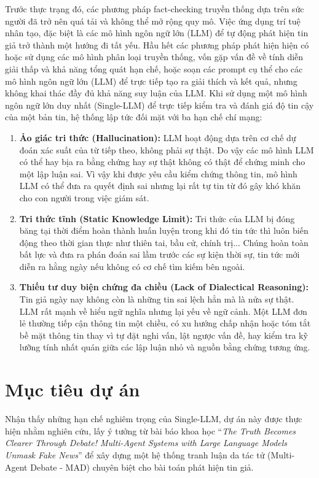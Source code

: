 \documentclass[12pt,a4paper]{report}
\begin{document}
Trước thực trạng đó, các phương pháp fact-checking truyền thống dựa trên sức người đã trở nên quá tải và không thể mở rộng quy mô. Việc ứng dụng trí tuệ nhân tạo, đặc biệt là các mô hình ngôn ngữ lớn (LLM) để tự động phát hiện tin giả trở thành một hướng đi tất yếu. Hầu hết các phương pháp phát hiện hiện có hoặc sử dụng các mô hình phân loại truyền thống, vốn gặp vấn đề về tính diễn giải thấp và khả năng tổng quát hạn chế, hoặc soạn các prompt cụ thể cho các mô hình ngôn ngữ lớn (LLM) để trực tiếp tạo ra giải thích và kết quả, nhưng không khai thác đầy đủ khả năng suy luận của LLM. Khi sử dụng một mô hình ngôn ngữ lớn duy nhất (Single-LLM) để trực tiếp kiểm tra và đánh giá độ tin cậy của một bản tin, hệ thống lập tức đối mặt với ba hạn chế chí mạng:
\begin{enumerate}
    \item \textbf{Ảo giác tri thức (Hallucination):} LLM hoạt động dựa trên cơ chế dự đoán xác suất của từ tiếp theo, không phải sự thật. Do vậy các mô hình LLM có thể hay bịa ra bằng chứng hay sự thật không có thật để chứng minh cho một lập luận sai. Vì vậy khi được yêu cầu kiểm chứng thông tin, mô hình LLM có thể đưa ra quyết định sai nhưng lại rất tự tin từ đó gây khó khăn cho con người trong việc giám sát.
    \item \textbf{Tri thức tĩnh (Static Knowledge Limit):} Tri thức của LLM bị đóng băng tại thời điểm hoàn thành huấn luyện trong khi đó tin tức thì luôn biến động theo thời gian thực như thiên tai, bầu cử, chính trị... Chúng hoàn toàn bất lực và đưa ra phán đoán sai lầm trước các sự kiện thời sự, tin tức mới diễn ra hằng ngày nếu không có cơ chế tìm kiếm bên ngoài.
    \item \textbf{Thiếu tư duy biện chứng đa chiều (Lack of Dialectical Reasoning):} Tin giả ngày nay không còn là những tin sai lệch hẳn mà là nửa sự thật. LLM rất mạnh về hiểu ngữ nghĩa nhưng lại yếu về ngữ cảnh. Một LLM đơn lẻ thường tiếp cận thông tin một chiều, có xu hướng chấp nhận hoặc tóm tắt bề mặt thông tin thay vì tự đặt nghi vấn, lật ngược vấn đề, hay kiểm tra kỹ lưỡng tính nhất quán giữa các lập luận nhỏ và nguồn bằng chứng tương ứng.
\end{enumerate}

\section{Mục tiêu dự án}
Nhận thấy những hạn chế nghiêm trọng của Single-LLM, dự án này được thực hiện nhằm nghiên cứu, lấy ý tưởng từ bài báo khoa học ``\textit{The Truth Becomes Clearer Through Debate! Multi-Agent Systems with Large Language Models Unmask Fake News}'' để xây dựng một hệ thống tranh luận da tác tử (Multi-Agent Debate - MAD) chuyên biệt cho bài toán phát hiện tin giả. 
\end{document}
